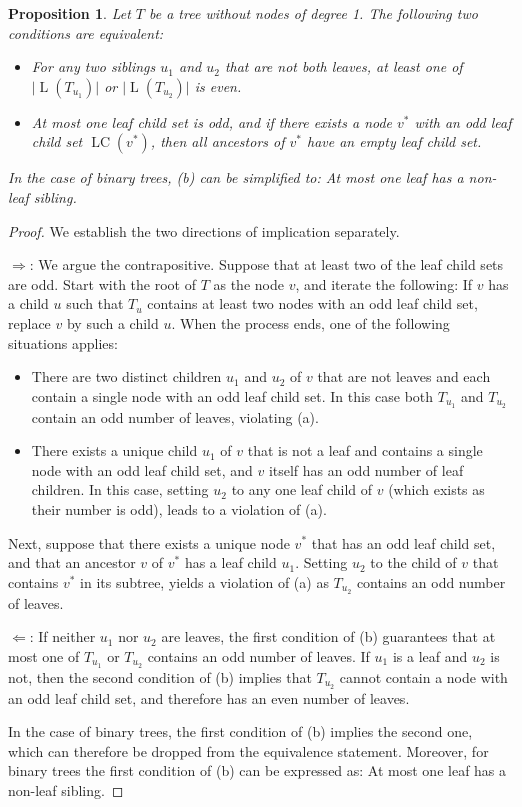 \documentclass[11pt]{article}
\numberwithin{equation}{section}
\newtheorem{proposition}[theorem]{Proposition}
\theoremstyle{definition}
\theoremstyle{plain}
\DeclareMathOperator{\leafset}{L}
\DeclareMathOperator{\leafchildset}{LC}
\begin{document}
\begin{proposition}\label{prop:connectivity:equivalence}
Let $T$ be a tree without nodes of degree 1. The following two conditions are equivalent:
\begin{itemize}
\item[(a)] For any two siblings $u_1$ and $u_2$ that are not both leaves, at least one of $\lvert\leafset(T_{u_1})\rvert$ or $\lvert\leafset(T_{u_2})\rvert$ is even.
\item[(b)] At most one leaf child set is odd, and if there exists a node $v^*$ with an odd leaf child set $\leafchildset(v^*)$, then all ancestors of $v^*$ have an empty leaf child set.
\end{itemize}
In the case of binary trees, (b) can be simplified to: At most one leaf has a non-leaf sibling.
\end{proposition}
\begin{proof}
We establish the two directions of implication separately. 

\medskip

\noindent
$\Rightarrow$: We argue the contrapositive. Suppose that at least two of the leaf child sets are odd. Start with the root of $T$ as the node $v$, and iterate the following: If $v$ has a child $u$ such that $T_u$ contains at least two nodes with an odd leaf child set, replace $v$ by such a child $u$. When the process ends, one of the following situations applies:
\begin{itemize}
\item There are two distinct children $u_1$ and $u_2$ of $v$ that are not leaves and each contain a single node with an odd leaf child set. In this case both $T_{u_1}$ and $T_{u_2}$ contain an odd number of leaves, violating (a).
\item There exists a unique child $u_1$ of $v$ that is not a leaf and contains a single node with an odd leaf child set, and $v$ itself has an odd number of leaf children. In this case, setting $u_2$ to any one leaf child of $v$ (which exists as their number is odd), leads to a violation of (a).
\end{itemize} 
Next, suppose that there exists a unique node $v^*$ that has an odd leaf child set, and that an ancestor $v$ of $v^*$ has a leaf child $u_1$. Setting $u_2$ to the child of $v$ that contains $v^*$ in its subtree, yields a violation of (a) as $T_{u_2}$ contains an odd number of leaves.

\medskip

\noindent
$\Leftarrow$: If neither $u_1$ nor $u_2$ are leaves, the first condition of (b) guarantees that at most one of $T_{u_1}$ or $T_{u_2}$ contains an odd number of leaves. If $u_1$ is a leaf and $u_2$ is not, then the second condition of (b) implies that $T_{u_2}$ cannot contain a node with an odd leaf child set, and therefore has an even number of leaves.

\medskip

In the case of binary trees, the first condition of (b) implies the second one, which can therefore be dropped from the equivalence statement. Moreover, for binary trees the first condition of (b) can be expressed as: At most one leaf has a non-leaf sibling.
\end{proof}
\end{document}
